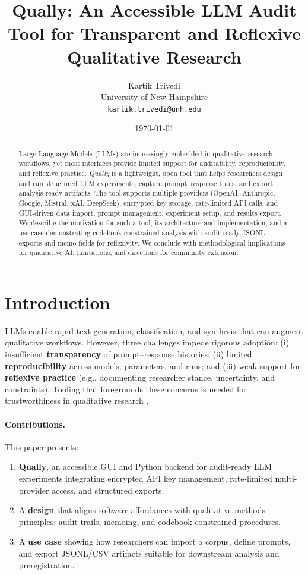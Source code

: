 \documentclass[11pt,a4paper]{article}
\title{Qually: An Accessible LLM Audit Tool for Transparent and Reflexive Qualitative Research}
\author{
  Kartik Trivedi \\
  \small University of New Hampshire \\
  \small \texttt{kartik.trivedi@unh.edu}
}
\date{\today}
\begin{document}
\maketitle

\begin{abstract}
Large Language Models (LLMs) are increasingly embedded in qualitative research workflows, yet most interfaces provide limited support for auditability, reproducibility, and reflexive practice. \emph{Qually} is a lightweight, open tool that helps researchers design and run structured LLM experiments, capture prompt--response trails, and export analysis-ready artifacts. The tool supports multiple providers (OpenAI, Anthropic, Google, Mistral, xAI, DeepSeek), encrypted key storage, rate-limited API calls, and GUI-driven data import, prompt management, experiment setup, and results export. We describe the motivation for such a tool, its architecture and implementation, and a use case demonstrating codebook-constrained analysis with audit-ready JSONL exports and memo fields for reflexivity. We conclude with methodological implications for qualitative AI, limitations, and directions for community extension.
\end{abstract}

\section{Introduction}
\label{sec:introduction}
LLMs enable rapid text generation, classification, and synthesis that can augment qualitative workflows. However, three challenges impede rigorous adoption: (i) insufficient \textbf{transparency} of prompt--response histories; (ii) limited \textbf{reproducibility} across models, parameters, and runs; and (iii) weak support for \textbf{reflexive practice} (e.g., documenting researcher stance, uncertainty, and constraints). Tooling that foregrounds these concerns is needed for trustworthiness in qualitative research \cite{lincoln1985naturalistic,braun2006using,miles2014qualitative,bender2021dangers,bommasani2021opportunities}.

\paragraph{Contributions.} This paper presents:
\begin{enumerate}[leftmargin=*]
  \item \textbf{Qually}, an accessible GUI and Python backend for audit-ready LLM experiments integrating encrypted API key management, rate-limited multi-provider access, and structured exports.
  \item A \textbf{design} that aligns software affordances with qualitative methods principles: audit trails, memoing, and codebook-constrained procedures.
  \item A \textbf{use case} showing how researchers can import a corpus, define prompts, and export JSONL/CSV artifacts suitable for downstream analysis and preregistration.
\end{enumerate}
\end{document}
